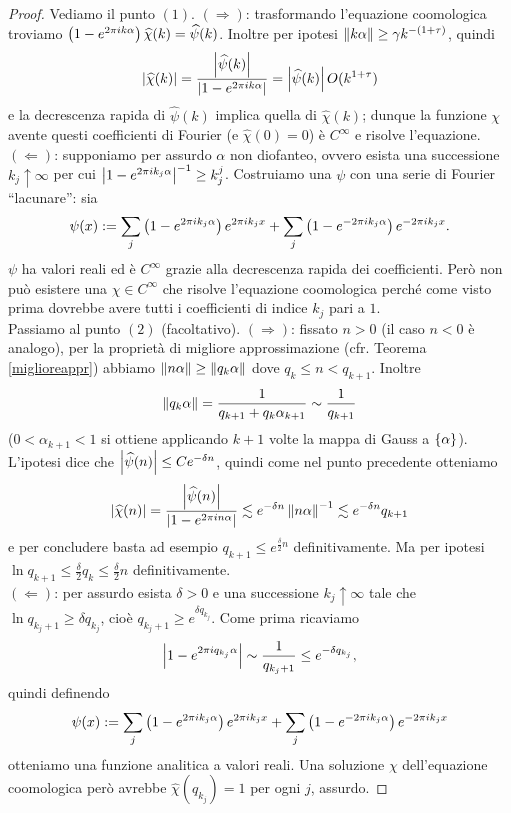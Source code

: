 \begin{proof}Vediamo il punto $(1)$. $(\Rightarrow)$: trasformando l'equazione coomologica troviamo
$\left(1-e^{2\pi i k\alpha}\right)\widehat{\chi}(k)=\widehat{\psi}(k)$. Inoltre per ipotesi
$\left\|k\alpha\right\|\ge\gamma k^{-(1+\tau)}$, quindi
\[ \left|\widehat{\chi}(k)\right|=\frac{\left|\widehat{\psi}(k)\right|}{\left|1-e^{2\pi i k\alpha}\right|}=\left|\widehat{\psi}(k)\right|O(k^{1+\tau}) \]
e la decrescenza rapida di $\widehat{\psi}(k)$ implica quella di $\widehat{\chi}(k)$;
dunque la funzione $\chi$ avente questi coefficienti di Fourier (e $\widehat{\chi}(0)=0$) è $C^\infty$ e risolve l'equazione. \\
$(\Leftarrow)$: supponiamo per assurdo $\alpha$ non diofanteo, ovvero esista una successione $k_j\uparrow\infty$
per cui $\left|1-e^{2\pi i k_j\alpha}\right|^{-1}\ge k_j^j$. Costruiamo una $\psi$ con una serie di Fourier ``lacunare'': sia
\[ \psi(x):=\sum_j \left(1-e^{2\pi i k_j\alpha}\right)e^{2\pi i k_j x}+\sum_j \left(1-e^{-2\pi i k_j\alpha}\right)e^{-2\pi i k_j x}. \]
$\psi$ ha valori reali ed è $C^\infty$ grazie alla decrescenza rapida dei coefficienti.
Però non può esistere una $\chi\in C^\infty$ che risolve l'equazione coomologica perché come visto prima
dovrebbe avere tutti i coefficienti di indice $k_j$ pari a $1$. \\
Passiamo al punto $(2)$ (facoltativo). $(\Rightarrow)$: fissato $n>0$ (il caso $n<0$ è analogo), per la proprietà di migliore approssimazione (cfr. Teorema \ref{miglioreappr})
abbiamo $\left\|n\alpha\right\|\ge\left\|q_k\alpha\right\|$ dove $q_k\le n<q_{k+1}$. Inoltre
\[ \left\|q_k\alpha\right\|=\frac{1}{q_{k+1}+q_k\alpha_{k+1}}\sim\frac{1}{q_{k+1}} \]
($0<\alpha_{k+1}<1$ si ottiene applicando $k+1$ volte la mappa di Gauss a $\left\{\alpha\right\}$).
L'ipotesi dice che $\left|\widehat{\psi}(n)\right|\le Ce^{-\delta n}$, quindi come nel punto precedente otteniamo
\[ \left|\widehat{\chi}(n)\right|=\frac{\left|\widehat{\psi}(n)\right|}{\left|1-e^{2\pi i n\alpha}\right|}\lesssim e^{-\delta n}\left\|n\alpha\right\|^{-1}
\lesssim e^{-\delta n}q_{k+1} \]
e per concludere basta ad esempio $q_{k+1}\le e^{\frac{\delta}{2}n}$ definitivamente.
Ma per ipotesi $\ln q_{k+1}\le \frac{\delta}{2}q_k\le\frac{\delta}{2}n$ definitivamente. \\
$(\Leftarrow)$: per assurdo esista $\delta>0$ e una successione $k_j\uparrow\infty$ tale che
$\ln q_{k_j+1}\ge\delta q_{k_j}$, cioè $q_{k_j+1}\ge e^{\delta q_{k_j}}$. Come prima ricaviamo
\[ \left|1-e^{2\pi i q_{k_j}\alpha}\right|\sim\frac{1}{q_{k_j+1}}\le e^{-\delta q_{k_j}}, \]
quindi definendo
\[ \psi(x):=\sum_j \left(1-e^{2\pi i k_j\alpha}\right)e^{2\pi i k_j x}+\sum_j \left(1-e^{-2\pi i k_j\alpha}\right)e^{-2\pi i k_j x} \]
otteniamo una funzione analitica a valori reali. Una soluzione $\chi$ dell'equazione coomologica però avrebbe
$\widehat{\chi}(q_{k_j})=1$ per ogni $j$, assurdo.
\end{proof}

